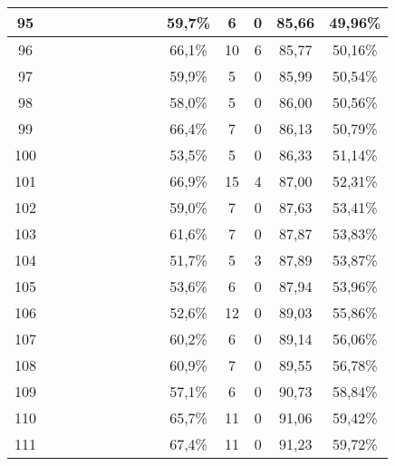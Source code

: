 \begin{longtable}{|c|c|c|c|c|c|c|c|c|c|c|c|c|c|}
95  &  \x    & \x    & \x    &       &       &       &       & \x    & 59,7\% &  6  & 0  & 85,66 & 49,96\% \\ \hline
96  &  \x    & \x    & \x    &       & \x\m  &       & \x\m  &       & 66,1\% &  10 & 6  & 85,77 & 50,16\% \\ \hline
97  &  \x    & \x    & \x    &       &       & \x    & \x    &       & 59,9\% &  5  & 0  & 85,99 & 50,54\% \\ \hline
98  &  \x    & \x    &       &       & \x    & \x    &       &       & 58,0\% &  5  & 0  & 86,00 & 50,56\% \\ \hline
99  &  \x    & \x    & \x    &       & \x\m  &       &       & \x    & 66,4\% &  7  & 0  & 86,13 & 50,79\% \\ \hline
100 &  \x    & \x    &       & \x    &       & \x    &       &       & 53,5\% &  5  & 0  & 86,33 & 51,14\% \\ \hline
101 &  \x    & \x    &       &       & \x\m  &       &       & \x\m  & 66,9\% &  15 & 4  & 87,00 & 52,31\% \\ \hline
102 &  \x    & \x    & \x    &       &       & \x    &       & \x\m  & 59,0\% &  7  & 0  & 87,63 & 53,41\% \\ \hline
103 &  \x    & \x    & \x    & \x    &       & \x\m  & \x\m  &       & 61,6\% &  7  & 0  & 87,87 & 53,83\% \\ \hline
104 &  \x    & \x    &       &       &       & \x    &       &       & 51,7\% &  5  & 3  & 87,89 & 53,87\% \\ \hline
105 &  \x    & \x    &       & \x    &       &       &       &       & 53,6\% &  6  & 0  & 87,94 & 53,96\% \\ \hline
106 &  \x    & \x    &       &       &       &       &       &       & 52,6\% &  12 & 0  & 89,03 & 55,86\% \\ \hline
107 &  \x    & \x    & \x    &       &       & \x    & \x\m  &       & 60,2\% &  6  & 0  & 89,14 & 56,06\% \\ \hline
108 &  \x    & \x    & \x    & \x    &       &       &       & \x    & 60,9\% &  7  & 0  & 89,55 & 56,78\% \\ \hline
109 &  \x    & \x    &       &       & \x    & \x    & \x    &       & 57,1\% &  6  & 0  & 90,73 & 58,84\% \\ \hline
110 &  \x    & \x    &       & \x    & \x\m  &       &       &       & 65,7\% &  11 & 0  & 91,06 & 59,42\% \\ \hline
111 &  \x    & \x    &       &       & \x\m  &       &       &       & 67,4\% &  11 & 0  & 91,23 & 59,72\% \\ \hline

\end{longtable}
